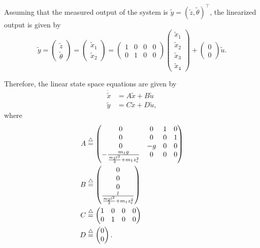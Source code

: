 Assuming that the measured output of the system is $\tilde{y}=(\tilde{z}, \tilde{\theta})^\top$, the linearized output is given by
\[
  \tilde{y} = \begin{pmatrix} \tilde{z} \\ \tilde{\theta} \end{pmatrix} = \begin{pmatrix} \tilde{x}_1 \\ \tilde{x}_2 \end{pmatrix} =  \begin{pmatrix}
    1 & 0 & 0 & 0 \\
    0 & 1 & 0 & 0
  \end{pmatrix}
  \begin{pmatrix}
    \tilde{x}_1 \\
    \tilde{x}_2 \\
    \tilde{x}_3 \\
    \tilde{x}_4
  \end{pmatrix}
  +
  \begin{pmatrix}
    0 \\
    0
  \end{pmatrix} \tilde{u}.
\]

Therefore, the linear state space equations are given by
\begin{align*}
	\dot{\tilde{x}} &= A\tilde{x} + B\tilde{u} \\
	\tilde{y} &= C\tilde{x} + D\tilde{u},
\end{align*} 
where
\begin{align*}
A &\stackrel{\triangle}{=} \begin{pmatrix}
     0 & 0  & 1 & 0 \\
     0 & 0  & 0 & 1 \\
     0 & -g & 0 & 0\\
    - \frac{m_1 g}{\frac{m_2 l^2}{3} + m_1 z_e^2} & 0 & 0 & 0 \end{pmatrix} \\
B &\stackrel{\triangle}{=} \begin{pmatrix}
    0 \\
    0 \\
    0 \\
    \frac{l}{\frac{m_2 l^2}{3} + m_1 z_e^2} 
  \end{pmatrix} \\
C &\stackrel{\triangle}{=} \begin{pmatrix}
    1 & 0 & 0 & 0 \\
    0 & 1 & 0 & 0
  \end{pmatrix} \\
D &\stackrel{\triangle}{=} \begin{pmatrix}
    0 \\
    0
  \end{pmatrix}.
\end{align*}
